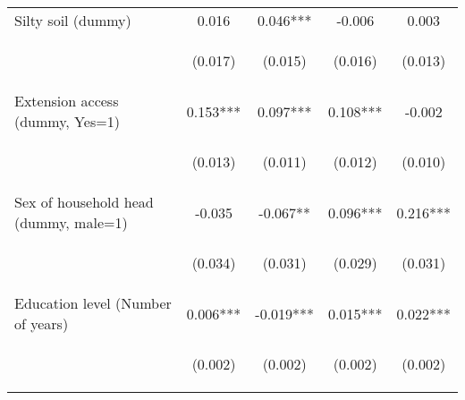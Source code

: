 \begin{center}
\begin{tabular}{lcccc}
Silty soil (dummy) & 0.016 & 0.046*** & -0.006 & 0.003 \\
\vspace{4pt} & \begin{footnotesize}(0.017)\end{footnotesize} & \begin{footnotesize}(0.015)\end{footnotesize} & \begin{footnotesize}(0.016)\end{footnotesize} & \begin{footnotesize}(0.013)\end{footnotesize} \\
Extension access (dummy, Yes=1) & 0.153*** & 0.097*** & 0.108*** & -0.002 \\
\vspace{4pt} & \begin{footnotesize}(0.013)\end{footnotesize} & \begin{footnotesize}(0.011)\end{footnotesize} & \begin{footnotesize}(0.012)\end{footnotesize} & \begin{footnotesize}(0.010)\end{footnotesize} \\
Sex of household head (dummy, male=1) & -0.035 & -0.067** & 0.096*** & 0.216*** \\
\vspace{4pt} & \begin{footnotesize}(0.034)\end{footnotesize} & \begin{footnotesize}(0.031)\end{footnotesize} & \begin{footnotesize}(0.029)\end{footnotesize} & \begin{footnotesize}(0.031)\end{footnotesize} \\
Education level (Number of years) & 0.006*** & -0.019*** & 0.015*** & 0.022*** \\
\vspace{4pt} & \begin{footnotesize}(0.002)\end{footnotesize} & \begin{footnotesize}(0.002)\end{footnotesize} & \begin{footnotesize}(0.002)\end{footnotesize} & \begin{footnotesize}(0.002)\end{footnotesize} \\

\end{tabular}
\end{center}
